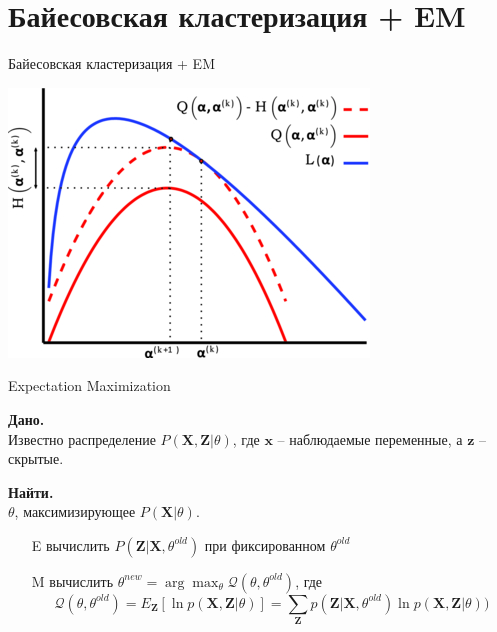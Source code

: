 \documentclass[aspectratio=169]{beamer}
\begin{document}
\section{Байесовская кластеризация + EM}


\begin{frame}

\begin{center}
{\Large Байесовская кластеризация + EM}

\vspace{1em}
\includegraphics[height=0.5\textheight]{images/em.jpg}
\end{center}

\end{frame}

\begin{frame}{Expectation Maximization}

{\bf Дано.} \\ Известно распределение $P(\mathbf{X}, \mathbf{Z} | \theta)$, где $\mathbf{x}$ -- наблюдаемые переменные, а $\mathbf{z}$ -- скрытые. 

{\bf Найти.} \\ $\theta$,  максимизирующее $P(\mathbf{X} | \theta)$.

\vspace{1em}
\begin{itemize}
\item[E] вычислить $P(\mathbf{Z} | \mathbf{X}, \theta^{old})$ при фиксированном $\theta^{old}$
\item[M] вычислить $\theta^{new} = \arg \max_{\theta} \mathcal{Q} (\theta, \theta^{old})$, где
\[
\mathcal{Q} (\theta, \theta^{old}) = E_\mathbf{Z}[\ln p(\mathbf{X}, \mathbf{Z} | \theta)] = \sum_{\mathbf{Z}} p(\mathbf{Z} | \mathbf{X}, \theta^{old}) \ln p(\mathbf{X}, \mathbf{Z} | \theta))
\]
\end{itemize}

\end{frame}
\end{document}
